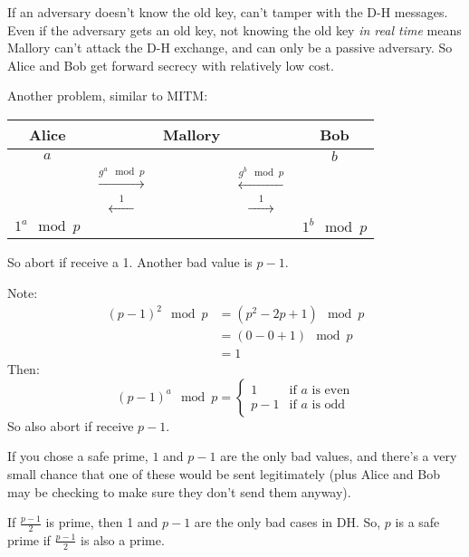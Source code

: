 If an adversary doesn't know the old key, can't tamper with the D-H messages.
Even if the adversary gets an old key, not knowing the old key \emph{in real
time} means Mallory can't attack the D-H exchange, and can only be a passive adversary. So Alice and Bob get forward
secrecy with relatively low cost.

Another problem, similar to MITM:

\begin{table}[h!]
\centering
\begin{tabular}{ccccc}
Alice & & Mallory & & Bob\\
\hline
$a$ & & & & $b$\\
& $\xrightarrow{g^a \mod p}$ & & $\xleftarrow{g^b \mod p}$ &\\
& $\xleftarrow{\quad1\quad}$ & & $\xrightarrow{\quad1\quad}$ &\\
$1^a \mod p$ & & & & $1^b \mod p$
\end{tabular}
\end{table}

So abort if receive a 1. Another bad value is $p-1$.

Note: \begin{align*}
\left(p-1\right)^2 \mod p &= \left(p^2 - 2p + 1\right) \mod p\\
    &= (0-0+1) \mod p\\
    &= 1
\end{align*}
Then:
$$\left(p-1\right)^a \mod p = \begin{cases}1 &\mbox{if $a$ is even}\\
    p-1 &\mbox{if $a$ is odd}\end{cases}$$
So also abort if receive $p-1$.

If you chose a safe prime, $1$ and $p-1$ are the only bad values, and there's a
very small chance that one of these would be sent legitimately (plus Alice and
Bob may be checking to make sure they don't send them anyway).\\


\begin{theorem}
If $\frac{p-1}{2}$ is prime, then 1 and $p-1$ are the only bad cases in DH.
So, $p$ is a safe prime if $\frac{p-1}{2}$ is also a prime.
\end{theorem}
